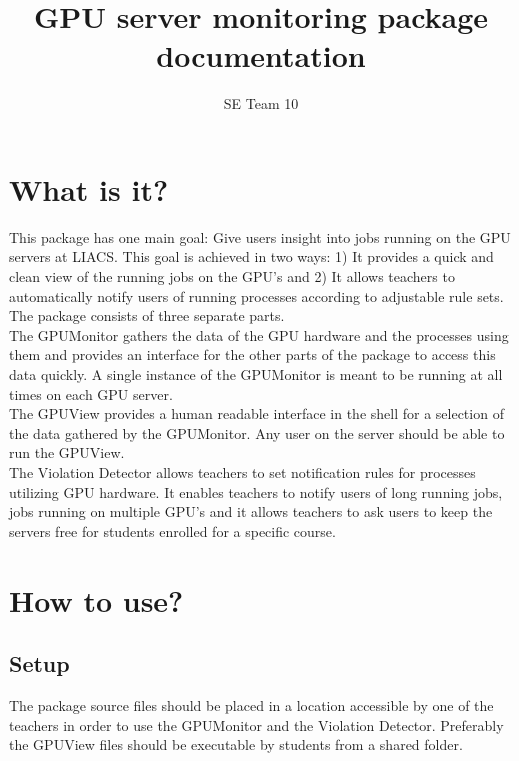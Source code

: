 \documentclass[10pt]{article}
\title{GPU server monitoring package documentation}
\author{SE Team 10}
\begin{document}

\maketitle

\section{What is it?}

    This package has one main goal: Give users insight into jobs running 
    on the GPU servers at LIACS. This goal is achieved in two ways: 1) 
    It provides a quick and clean view of the running jobs on the GPU's
    and 2) It allows teachers to automatically notify users of running
    processes according to adjustable rule sets.\\

    The package consists of three separate parts.\\
    The GPUMonitor gathers the data of the GPU hardware and the processes 
    using them and provides an interface for the other parts of the package 
    to access this data quickly. A single instance of the GPUMonitor is 
    meant to be running at all times on each GPU server.\\

    The GPUView provides a human readable interface in the shell for a 
    selection of the data gathered by the GPUMonitor. Any user on the server
    should be able to run the GPUView.\\
    
    The Violation Detector allows teachers to set notification rules for
    processes utilizing GPU hardware. It enables teachers to notify users
    of long running jobs, jobs running on multiple GPU's and it allows 
    teachers to ask users to keep the servers free for students enrolled
    for a specific course.

\section{How to use?}
\subsection{Setup}
The package source files should be placed in a location accessible 
by one of the teachers in order to use the GPUMonitor and the 
Violation Detector. Preferably the GPUView files should be executable
by students from a shared folder.
\end{document}
